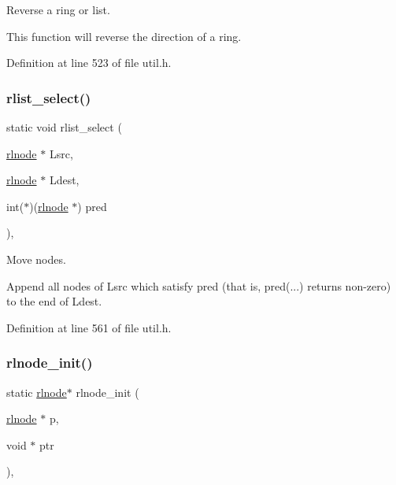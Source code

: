 Reverse a ring or list. 

This function will reverse the direction of a ring. 

Definition at line 523 of file util.\+h.

\mbox{\label{group__rlists_ga6016cbc055d242a03d823ebfec422c2b}} 
\subsubsection{\texorpdfstring{rlist\+\_\+select()}{rlist\_select()}}
{\footnotesize\ttfamily static void rlist\+\_\+select (\begin{DoxyParamCaption}\item[{\hyperlink{group__rlists_ga8f6244877f7ce2322c90525217ea6e7a}{rlnode} $\ast$}]{Lsrc,  }\item[{\hyperlink{group__rlists_ga8f6244877f7ce2322c90525217ea6e7a}{rlnode} $\ast$}]{Ldest,  }\item[{int($\ast$)(\hyperlink{group__rlists_ga8f6244877f7ce2322c90525217ea6e7a}{rlnode} $\ast$)}]{pred }\end{DoxyParamCaption})\hspace{0.3cm}{\ttfamily [inline]}, {\ttfamily [static]}}



Move nodes. 

Append all nodes of Lsrc which satisfy pred (that is, pred(...) returns non-\/zero) to the end of Ldest. 

Definition at line 561 of file util.\+h.

\mbox{\label{group__rlists_ga578e6dc256d4f1580bd8500edf374aca}} 
\subsubsection{\texorpdfstring{rlnode\+\_\+init()}{rlnode\_init()}}
{\footnotesize\ttfamily static \hyperlink{group__rlists_ga8f6244877f7ce2322c90525217ea6e7a}{rlnode}$\ast$ rlnode\+\_\+init (\begin{DoxyParamCaption}\item[{\hyperlink{group__rlists_ga8f6244877f7ce2322c90525217ea6e7a}{rlnode} $\ast$}]{p,  }\item[{void $\ast$}]{ptr }\end{DoxyParamCaption})\hspace{0.3cm}{\ttfamily [inline]}, {\ttfamily [static]}}



